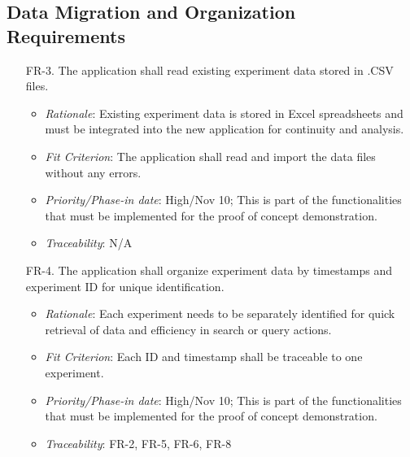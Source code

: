 \documentclass[12pt]{article}
\begin{document}
\subsection{Data Migration and Organization Requirements}
  \begin{enumerate}
    \item[FR-3.] The application shall read existing experiment data stored in .CSV files.
    \begin{itemize}
      \item \textit{Rationale}: Existing experiment data is stored in Excel spreadsheets and must be integrated into the new application for continuity and analysis.
      \item \textit{Fit Criterion}: The application shall read and import the data files without any errors.
      \item \textit{Priority/Phase-in date}: High/Nov 10; This is part of the functionalities that must be implemented for the proof of concept demonstration.
      \item \textit{Traceability}: N/A
    \end{itemize}
    \item[FR-4.] The application shall organize experiment data by timestamps and experiment ID for unique identification.
    \begin{itemize}
      \item \textit{Rationale}: Each experiment needs to be separately identified for quick retrieval of data and efficiency in search or query actions.
      \item \textit{Fit Criterion}: Each ID and timestamp shall be traceable to one experiment.
      \item \textit{Priority/Phase-in date}: High/Nov 10; This is part of the functionalities that must be implemented for the proof of concept demonstration.
      \item \textit{Traceability}: FR-2, FR-5, FR-6, FR-8
    \end{itemize}
  \end{enumerate}
\end{document}
